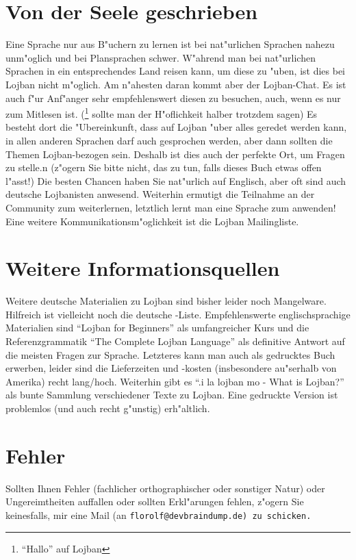\section{Von der Seele geschrieben}
Eine Sprache nur aus B"uchern zu lernen ist bei nat"urlichen Sprachen nahezu unm"oglich und bei Plansprachen schwer. W"ahrend
man bei nat"urlichen Sprachen in ein entsprechendes Land reisen kann, um diese zu "uben, ist dies bei Lojban nicht m"oglich.
Am n"ahesten daran kommt aber der Lojban-Chat. Es ist auch f"ur Anf"anger sehr empfehlenswert diesen zu besuchen, auch, wenn es nur zum Mitlesen ist. (\footnote{``Hallo'' auf Lojban} sollte man der H"oflichkeit halber trotzdem sagen)
Es besteht dort die "Ubereinkunft, dass auf Lojban "uber alles geredet werden kann, in allen anderen Sprachen darf auch gesprochen werden,
aber dann sollten die Themen Lojban-bezogen sein. Deshalb ist dies auch der perfekte Ort, um Fragen zu stelle.n (z"ogern Sie bitte nicht, das zu tun, falls dieses Buch etwas offen l"asst!)
Die besten Chancen haben Sie nat"urlich auf Englisch, aber oft sind auch deutsche Lojbanisten anwesend.
Weiterhin ermutigt die Teilnahme an der Community zum weiterlernen, letztlich lernt man eine Sprache zum anwenden!
Eine weitere Kommunikationsm"oglichkeit ist die Lojban Mailingliste.

\section{Weitere Informationsquellen}
Weitere deutsche Materialien zu Lojban sind bisher leider noch Mangelware. Hilfreich ist vielleicht noch die deutsche -Liste.
Empfehlenswerte englischsprachige Materialien sind ``Lojban for Beginners'' als umfangreicher Kurs und die Referenzgrammatik ``The Complete Lojban Language'' als definitive Antwort
auf die meisten Fragen zur Sprache. Letzteres kann man auch als gedrucktes Buch erwerben, leider sind die Lieferzeiten und -kosten (insbesondere au"serhalb von Amerika) recht lang/hoch.
Weiterhin gibt es ``.i la lojban mo - What is Lojban?'' als bunte Sammlung verschiedener Texte zu Lojban. Eine gedruckte Version ist problemlos (und auch recht g"unstig) erh"altlich.

\section{Fehler}
Sollten Ihnen Fehler (fachlicher orthographischer oder sonstiger Natur) oder Ungereimtheiten auffallen oder sollten
Erkl"arungen fehlen, z"ogern Sie keinesfalls, mir eine Mail (an \tt{florolf@devbraindump.de}\rm{}) zu schicken.
